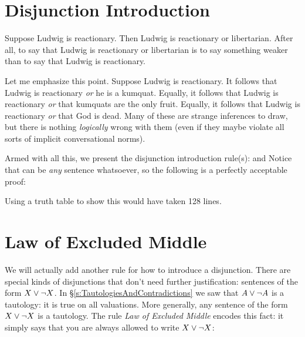 \section{Disjunction Introduction}
Suppose Ludwig is reactionary. Then Ludwig is reactionary or libertarian. After all, to say that Ludwig is reactionary or libertarian is to say something weaker than to say that Ludwig is reactionary. 

Let me emphasize this point. Suppose Ludwig is reactionary. It follows that Ludwig is reactionary \emph{or} he is a kumquat. Equally, it follows that Ludwig is reactionary \emph{or} that kumquats are the only fruit.  Equally, it follows that Ludwig is reactionary \emph{or} that God is dead. Many of these are strange inferences to draw, but there is nothing \emph{logically} wrong with them (even if they maybe violate all sorts of implicit conversational norms).

Armed with all this, we present the disjunction introduction rule(s):
and
Notice that \metaY can be \emph{any} sentence whatsoever, so the following is a perfectly acceptable proof:
\begin{pf}
\end{pf}
Using a truth table to show this would have taken 128 lines.


\section{Law of Excluded Middle}\label{sec:LEM}
We will actually add another rule for how to introduce a disjunction. There are special kinds of disjunctions that don't need further justification: sentences of the form $X\vee\neg X$.
In \S\ref{s:TautologiesAndContradictions} we saw that $A\vee\neg A$ is a tautology: it is true on all valuations. More generally, any sentence of the form $X\vee\neg X$ is a tautology.  
The rule \emph{Law of Excluded Middle} encodes this fact: it simply says that you are always allowed to write $X\vee\neg X$:


